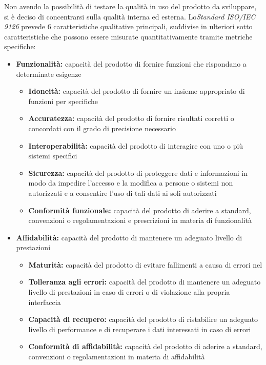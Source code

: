 \documentclass[12pt,a4paper]{article}
\begin{document}
	Non avendo la possibilità di testare la qualità in uso del prodotto  da sviluppare, si è deciso di concentrarsi sulla qualità interna ed esterna. Lo\textit{Standard ISO/IEC 9126} prevede 6 caratteristiche qualitative principali, suddivise in ulteriori sotto caratteristiche che possono essere misurate quantitativamente tramite metriche specifiche:
	
	\begin{itemize}
		\item \textbf{Funzionalità:} capacità del prodotto  di fornire funzioni che rispondano a determinate esigenze
		\begin{itemize}
			\item \textbf{Idoneità:} capacità del prodotto  di fornire un insieme appropriato di funzioni per  specifiche
			\item \textbf{Accuratezza:} capacità del prodotto  di fornire risultati corretti o concordati con il grado di precisione necessario
			\item \textbf{Interoperabilità:} capacità del prodotto  di interagire con uno o più sistemi specifici
			\item \textbf{Sicurezza:} capacità del prodotto  di proteggere dati e informazioni in modo da impedire l'accesso e la modifica a persone o sistemi non autorizzati e a consentire l'uso di tali dati ai soli autorizzati
			\item \textbf{Conformità funzionale:} capacità del prodotto  di aderire a standard, convenzioni o regolamentazioni e prescrizioni in materia di funzionalità
		\end{itemize}
		
		\item \textbf{Affidabilità:} capacità del prodotto  di mantenere un adeguato livello di prestazioni
		\begin{itemize}
			\item \textbf{Maturità:} capacità del prodotto  di evitare fallimenti a causa di errori nel  
			\item \textbf{Tolleranza agli errori: }capacità del prodotto  di mantenere un adeguato livello di prestazioni in caso di errori  o di violazione alla propria interfaccia
			\item \textbf{Capacità di recupero:} capacità del prodotto  di ristabilire un adeguato livello di performance e di recuperare i dati interessati in caso di errori
			\item \textbf{Conformità di affidabilità:} capacità del prodotto  di aderire a standard, convenzioni o regolamentazioni in materia di affidabilità
		\end{itemize}
		

\end{itemize}
\end{document}
